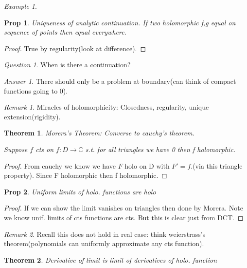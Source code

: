 \documentclass[11pt]{article}
\newcommand{\C}{\mathbb{C}}
\newtheorem{theorem}{Theorem}
\newtheorem{prop}{Prop}
\theoremstyle{remark}
\newtheorem{remark}{Remark}
\newtheorem{quest}{Question}
\newtheorem{ans}{Answer}
\newtheorem{example}{Example}
\begin{document}
\begin{example}
\begin{prop}
	Uniqueness of analytic continuation. If two holomorphic f,g equal on sequence of points then equal everywhere.
\end{prop}

\begin{proof}
	True by regularity(look at difference). 
\end{proof}

\begin{quest}
	When is there a continuation?
\end{quest}

\begin{ans}
	There should only be a problem at boundary(can think of compact functions going to 0).
\end{ans}

\begin{remark}
	Miracles of holomorphicity: Closedness, regularity, unique extension(rigidity).
\end{remark}

\begin{theorem}
	Morera's Theorem: Converse to cauchy's theorem.

	Suppose $f$ cts on $f : D \to \C$ s.t. for all triangles we have 0 then f holomorphic.
\end{theorem}

\begin{proof}
	From cauchy we know we have $F$ holo on D with $F' = f$.(via this triangle property). Since F holomorphic then f holomorphic. 
\end{proof}

\begin{prop}
	Uniform limits of holo. functions are holo
\end{prop}

\begin{proof}
	If we can show the limit vanishes on triangles then done by Morera. Note we know unif. limits of cts functions are cts. But this is clear just from DCT.
\end{proof}

\begin{remark}
	Recall this does not hold in real case: think weierstrass's theorem(polynomials can uniformly approximate any cts function).
\end{remark}

\begin{theorem}
	Derivative of limit is limit of derivatives of holo. function
\end{theorem}


\end{example}
\end{document}
